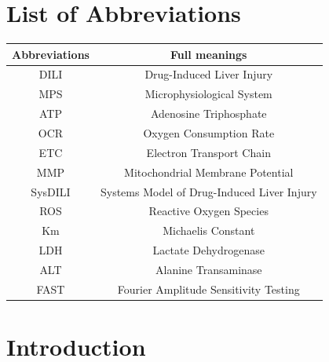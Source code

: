 \documentclass[12pt]{article}
\begin{document}
\section*{List of Abbreviations}
\thispagestyle{empty}
\begin{center}
\begin{tabular}{|c | c|} 
 \hline
 \textbf{Abbreviations} & \textbf{Full meanings} \\
 \hline\hline
 DILI & Drug-Induced Liver Injury  \\ 
 \hline
 MPS & Microphysiological System  \\
 \hline
 ATP & Adenosine Triphosphate\\
 \hline
  OCR & Oxygen Consumption Rate\\
 \hline
  ETC & Electron Transport Chain\\
 \hline
  MMP & Mitochondrial Membrane Potential\\
 \hline
  SysDILI & Systems Model of Drug-Induced Liver Injury\\
 \hline
 ROS & Reactive Oxygen Species\\
 \hline
 Km & Michaelis Constant\\
 \hline
 LDH & Lactate Dehydrogenase\\
 \hline
 ALT & Alanine Transaminase\\
 \hline
 FAST & Fourier Amplitude Sensitivity Testing \\
 \hline
\end{tabular}
\end{center}


\pagebreak
 \clearpage
\section{Introduction}
\end{document}
